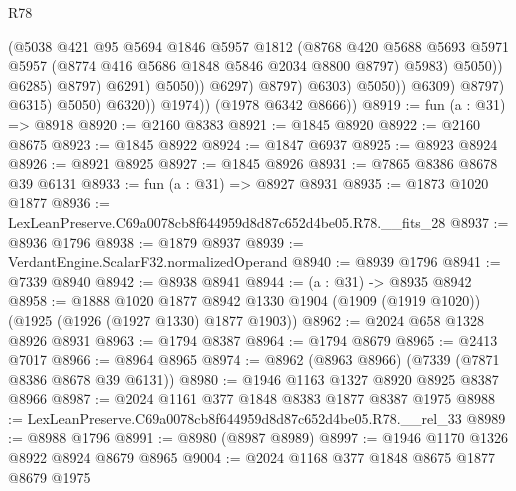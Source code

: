 \begin{lexlean}{R78}
\begin{coremodule}
                                            (@5038
                                              @421
                                              @95
                                              @5694
                                              @1846
                                              @5957
                                              @1812
                                              (@8768
                                                @420
                                                @5688
                                                @5693
                                                @5971
                                                @5957
                                                (@8774 @416 @5686 @1848 @5846 @2034 @8800 @8797)
                                                @5983)
                                              @5050))
                                          @6285)
                                        @8797)
                                      @6291)
                                    @5050))
                                @6297)
                              @8797)
                            @6303)
                          @5050))
                      @6309)
                    @8797)
                  @6315)
                @5050)
              @6320))
          @1974))
      (@1978 @6342 @8666))
@8919 := fun (a : @31) => @8918
@8920 := @2160 @8383
@8921 := @1845 @8920
@8922 := @2160 @8675
@8923 := @1845 @8922
@8924 := @1847 @6937
@8925 := @8923 @8924
@8926 := @8921 @8925
@8927 := @1845 @8926
@8931 := @7865 @8386 @8678 @39 @6131
@8933 := fun (a : @31) => @8927 @8931
@8935 := @1873 @1020 @1877
@8936 := LexLeanPreserve.C69a0078cb8f644959d8d87c652d4be05.R78.__fits_28
@8937 := @8936 @1796
@8938 := @1879 @8937
@8939 := VerdantEngine.ScalarF32.normalizedOperand
@8940 := @8939 @1796
@8941 := @7339 @8940
@8942 := @8938 @8941
@8944 := (a : @31) -> @8935 @8942
@8958 := @1888
    @1020
    @1877
    @8942
    @1330
    @1904
    (@1909 (@1919 @1020))
    (@1925 (@1926 (@1927 @1330) @1877 @1903))
@8962 := @2024 @658 @1328 @8926 @8931
@8963 := @1794 @8387
@8964 := @1794 @8679
@8965 := @2413 @7017
@8966 := @8964 @8965
@8974 := @8962 (@8963 @8966) (@7339 (@7871 @8386 @8678 @39 @6131))
@8980 := @1946 @1163 @1327 @8920 @8925 @8387 @8966
@8987 := @2024 @1161 @377 @1848 @8383 @1877 @8387 @1975
@8988 := LexLeanPreserve.C69a0078cb8f644959d8d87c652d4be05.R78.__rel_33
@8989 := @8988 @1796
@8991 := @8980 (@8987 @8989)
@8997 := @1946 @1170 @1326 @8922 @8924 @8679 @8965
@9004 := @2024 @1168 @377 @1848 @8675 @1877 @8679 @1975

\end{coremodule}
\end{lexlean}
